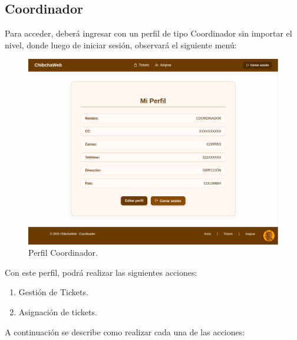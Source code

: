 \subsection{Coordinador}
Para acceder, deberá ingresar con un perfil de tipo Coordinador sin importar el nivel, donde luego de iniciar sesión, observará el siguiente menú:

\begin{figure}[H]
    \centering
    \includegraphics[width=0.75\linewidth]{guiamodulo/perfil-coordinador.png}
    \caption{Perfil Coordinador.}
    \label{fig:perfil-coordinador}
\end{figure}

Con este perfil, podrá realizar las siguientes acciones:

\begin{enumerate}
    \item Gestión de Tickets.
    \item Asignación de tickets.
\end{enumerate}

A continuación se describe como realizar cada una de las acciones:

